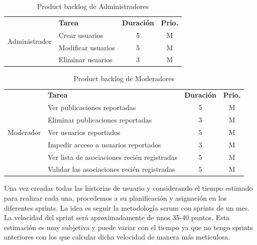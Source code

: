 \begin{table}[H]
	\centering
	\begin{tabular}{|c|p{8cm}|c|c|} \hline 
		\multirow[c]{4}{*}{Administrador}&  \textbf{Tarea}&  \textbf{Duración}& \textbf{Prio.}\\  \cline{2-4}
		&  Crear usuarios &  5& M\\ \cline{2-4}
		&  Modificar usuarios &  5& M\\ \cline{2-4}
		&  Eliminar usuarios &  3& M\\ \hline
		
		
		
	\end{tabular}
	\caption{Product backlog de Administradores}
	\label{tab:pb_administradores}
\end{table}

\begin{table}[H]
	\centering
	\begin{tabular}{|c|p{8cm}|c|c|} \hline 
		\multirow[c]{7}{*}{Moderador}&  \textbf{Tarea}&  \textbf{Duración}& \textbf{Prio.}\\  \cline{2-4}
		&  Ver publicaciones reportadas &  5& M\\ \cline{2-4}
		&  Eliminar publicaciones reportadas &  3& M\\ \cline{2-4}
		
		&  Ver usuarios reportados &  5& M\\ \cline{2-4}
		&  Impedir acceso a usuarios reportados &  3& M\\ \cline{2-4}
		
		&  Ver lista de asociaciones recién registradas &  5& M\\ \cline{2-4}
		&  Validar las asociaciones recién registradas& 5 & M\\ \hline
		
		
		
	\end{tabular}
	\caption{Product backlog de Moderadores}
	\label{tab:pb_moderadores}
\end{table}

Una vez creadas todas las historias de usuario y considerando el tiempo estimado para realizar cada una, procedemos a su planificación y asignación en los diferentes sprints. La idea es seguir la metodología scrum con sprints de un mes.  \\

La  velocidad del sprint será aproximadamente de unos 35-40 puntos. Esta estimación es muy subjetiva y puede variar con el tiempo ya que no tengo sprints anteriores con los que calcular dicha velocidad de manera más meticulosa.

